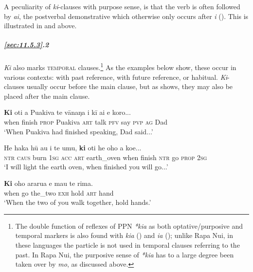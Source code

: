 A peculiarity of \textit{ki}{}-clauses with purpose sense, is that the verb is often followed by \textit{ai}, the postverbal demonstrative which otherwise only occurs after \textit{i} (). This is illustrated in  and  above.

\subparagraph{\ref{sec:11.5.3}.2} \textit{Ki} also marks \textsc{temporal} clauses.\footnote{\label{fn:525}The double function of reflexes of PPN \textit{*kia} as both optative/purposive and temporal markers is also found with  \textit{kia} (\citealt[62, 459]{Bauer1993}) and  \textit{{\ꞌ}ia} (\citealt[138–139]{LazardPeltzer2000}); unlike Rapa Nui, in these languages the particle is not used in temporal clauses referring to the past. In Rapa Nui, the purposive sense of \textit{*kia} has to a large degree been taken over by \textit{mo}, as discussed above.} As the examples below show, these occur in various contexts: with past reference, with future reference, or habitual. \textit{Ki}{}-clauses usually occur before the main clause, but as  shows, they may also be placed after the main clause.

\ea\label{ex:11.192}
\gll \textbf{Ki} oti a Puakiva te vānaŋa i kī ai e koro... \\
when finish \textsc{prop} Puakiva \textsc{art} talk \textsc{pfv} say \textsc{pvp} \textsc{ag} Dad \\

\glt 
‘When Puakiva had finished speaking, Dad said...’ \textstyleExampleref{[R229.490]} 
\z

\ea\label{ex:11.193}
\gll He haka hū au i te {\ꞌ}umu, \textbf{ki} oti he oho a koe... \\
\textsc{ntr} \textsc{caus} burn \textsc{1sg} \textsc{acc} \textsc{art} earth\_oven when finish \textsc{ntr} go \textsc{prop} \textsc{2sg} \\

\glt 
‘I will light the earth oven, when finished you will go...’ \textstyleExampleref{[R184.007]} 
\z

\ea\label{ex:11.194}
\gll \textbf{Ki} oho ararua e ma{\ꞌ}u te rima. \\
when go the\_two \textsc{exh} hold \textsc{art} hand \\

\glt 
‘When the two of you walk together, hold hands.’ \textstyleExampleref{[R166.004]} 
\z

